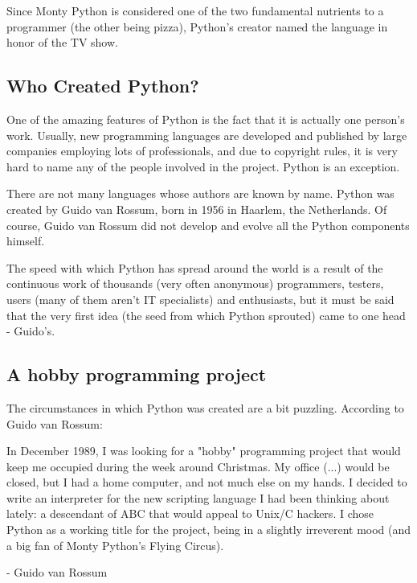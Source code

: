 \documentclass[a4paper,10pt]{article}
\begin{document}
Since Monty Python is considered one of the two fundamental nutrients to a programmer (the other being pizza), Python's creator named the language in honor of the TV show.

\subsection{Who Created Python?}
One of the amazing features of Python is the fact that it is actually one person's work. Usually, new programming languages are developed and published by large companies employing lots of professionals, and due to copyright rules, it is very hard to name any of the people involved in the project. Python is an exception.
\newline

There are not many languages whose authors are known by name. Python was created by Guido van Rossum, born in 1956 in Haarlem, the Netherlands. Of course, Guido van Rossum did not develop and evolve all the Python components himself.
\newline

The speed with which Python has spread around the world is a result of the continuous work of thousands (very often anonymous) programmers, testers, users (many of them aren't IT specialists) and enthusiasts, but it must be said that the very first idea (the seed from which Python sprouted) came to one head - Guido's.

\subsection{A hobby programming project}
The circumstances in which Python was created are a bit puzzling. According to Guido van Rossum:
\begin{displayquote}
 In December 1989, I was looking for a "hobby" programming project that would keep me occupied during the week around Christmas. My office (...) would be closed, but I had a home computer, and not much else on my hands. I decided to write an interpreter for the new scripting language I had been thinking about lately: a descendant of ABC that would appeal to Unix/C hackers. I chose Python as a working title for the project, being in a slightly irreverent mood (and a big fan of Monty Python's Flying Circus).

 - Guido van Rossum
\end{displayquote}
\end{document}
